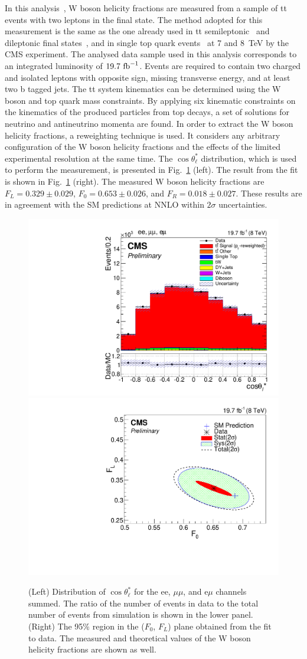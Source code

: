 \documentclass[a4paper]{PoS}
\begin{document}
In this analysis~\cite{TOP-14-017}, W boson helicity fractions are measured from
a sample of tt events with two leptons in the final state.
The method adopted for this measurement is the same as the one already used in tt
semileptonic~\cite{semileptonic-helicity-1, semileptonic-helicity-2} and dileptonic
final states~\cite{dileptonic-helicity}, and in single top quark
events~\cite{single-top-helicity} at 7 and 8~TeV by the CMS experiment.
The  analysed data sample used in this analysis corresponds to an integrated luminosity
of $19.7~{\rm fb}^{-1}$.
Events are required to contain two charged and isolated leptons with opposite sign, missing
transverse energy, and at least two b tagged jets.
The tt system kinematics can be determined using the W boson and top quark mass constraints.
By applying six kinematic constraints on the kinematics of the produced particles from top
decays, a set of solutions for neutrino and antineutrino momenta are found.
In order to extract the W boson helicity fractions, a reweighting technique is used.
It considers any arbitrary configuration of the W boson helicity fractions and the
effects of the limited experimental
resolution at the same time. The $\cos\theta_{\ell}^*$ distribution, which is used to
perform the measurement, is presented in Fig.~\ref{fig:CMS-TOP-014-017} (left).
The result from the fit is shown in Fig.~\ref{fig:CMS-TOP-014-017} (right).
The measured W boson helicity fractions are $F_L = 0.329 \pm 0.029$, $F_0 = 0.653 \pm 0.026$,
and $F_R = 0.018 \pm 0.027$.  These results are in agreement with the SM predictions at
NNLO within $2\sigma$ uncertainties.

\begin{figure}
\includegraphics[width=.40\textwidth]{figures/CMS-TOP-14-017_cos_theta}
\includegraphics[width=.50\textwidth]{figures/CMS-TOP-14-017_contour_2sigma}
\caption{(Left) Distribution of $\cos\theta^*_{\ell}$ for the ee, $\mu\mu$, and e$\mu$
  channels summed. The ratio of the number of events in data to the total number
  of events from simulation is shown in the lower panel. (Right) The 95\% region
  in the ($F_0$, $F_L$) plane obtained from the fit to data. The measured and
  theoretical values of the W boson helicity fractions are shown as well.}
\label{fig:CMS-TOP-014-017}
\end{figure}
\end{document}
